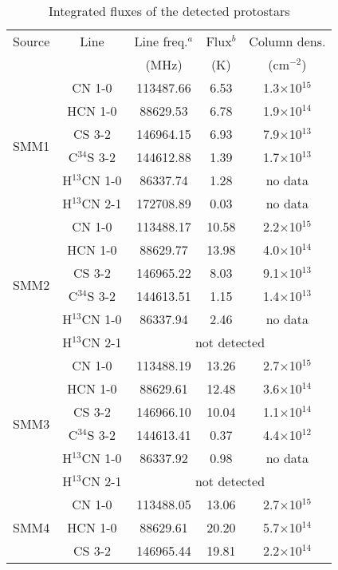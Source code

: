 \documentclass{aa}
\begin{document}
\begin{table}
\caption{Integrated fluxes of the detected protostars}             %
\label{table:4}      %
\centering                          %
\begin{tabular}{c c c c c} 
\hline\hline 
Source & Line & Line freq.$^a$ & Flux$^b$ & Column dens. \\
 &  & (MHz) & (K) & (cm$^{-2}$) \\
\hline  
\multirow{6}{*}{SMM1} & CN 1-0 & 113487.66 & 6.53 & 1.3$\times$10$^{15}$\\
{} & HCN 1-0 & 88629.53 & 6.78 & 1.9$\times$10$^{14}$ \\ 
{} & CS 3-2 & 146964.15 & 6.93 & 7.9$\times$10$^{13}$\\  
{} & C$^{34}$S 3-2 & 144612.88 & 1.39 & 1.7$\times$10$^{13}$\\ 
{} & H$^{13}$CN 1-0 & 86337.74 & 1.28 & no data\\ 
{} & H$^{13}$CN 2-1 & 172708.89 & 0.03 & no data\\  \hline
\multirow{6}{*}{SMM2} & CN 1-0 & 113488.17 & 10.58 & 2.2$\times$10$^{15}$ \\
{} & HCN 1-0 & 88629.77 & 13.98 & 4.0$\times$10$^{14}$\\ 
{} & CS 3-2 & 146965.22 & 8.03 & 9.1$\times$10$^{13}$\\  
{} & C$^{34}$S 3-2 & 144613.51 & 1.15 & 1.4$\times$10$^{13}$\\
{} & H$^{13}$CN 1-0 & 86337.94 & 2.46 & no data\\ 
{} & H$^{13}$CN 2-1 & \multicolumn{3}{c}{not detected}  \\  \hline
\multirow{6}{*}{SMM3} & CN 1-0 & 113488.19 & 13.26 & 2.7$\times$10$^{15}$\\
{} & HCN 1-0 & 88629.61 & 12.48 & 3.6$\times$10$^{14}$\\ 
{} & CS 3-2 & 146966.10 & 10.04 & 1.1$\times$10$^{14}$\\  
{} & C$^{34}$S 3-2 & 144613.41 & 0.37 & 4.4$\times$10$^{12}$\\
{} & H$^{13}$CN 1-0 & 86337.92 & 0.98 & no data\\ 
{} & H$^{13}$CN 2-1 & \multicolumn{3}{c}{not detected}  \\  \hline
\multirow{6}{*}{SMM4} & CN 1-0 & 113488.05 & 13.06 & 2.7$\times$10$^{15}$\\
{} & HCN 1-0 & 88629.61 & 20.20 & 5.7$\times$10$^{14}$ \\ 
{} & CS 3-2 & 146965.44 & 19.81 & 2.2$\times$10$^{14}$\\  

\end{tabular}
\end{table}
\end{document}
